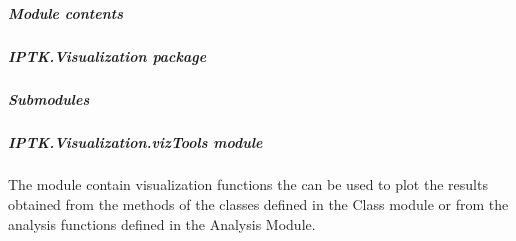 \documentclass[letterpaper,10pt,english]{sphinxmanual}
\begin{document}
\subparagraph{Module contents}
\label{\detokenize{IPTK.Utils:module-IPTK.Utils}}\label{\detokenize{IPTK.Utils:module-contents}}

\subparagraph{IPTK.Visualization package}
\label{\detokenize{IPTK.Visualization:iptk-visualization-package}}\label{\detokenize{IPTK.Visualization::doc}}

\subparagraph{Submodules}
\label{\detokenize{IPTK.Visualization:submodules}}

\subparagraph{IPTK.Visualization.vizTools module}
\label{\detokenize{IPTK.Visualization:module-IPTK.Visualization.vizTools}}\label{\detokenize{IPTK.Visualization:iptk-visualization-viztools-module}}
The module contain visualization functions the can be used to plot the results obtained from the 
methods of the classes defined in the Class module or from the analysis functions defined in the Analysis Module.
\end{document}
